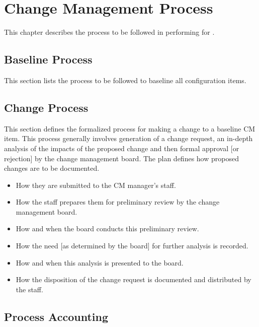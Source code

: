
\chapter{Change Management Process}
\label{loc:CM_Process}

This chapter describes the process to be followed in performing \CM for \ThisSystem.

\section{Baseline Process}
\label{loc:CM_ProcessBaseline}

This section lists the process to be followed to baseline all configuration items.

\section{Change Process}
\label{loc:CM_ProcessChange}

This section defines the formalized process for making a change to a baseline CM item. 
This process generally involves generation of a change request, an in-depth analysis of the impacts of the proposed change and then formal approval [or rejection] by the change management board. 
The plan defines how proposed changes are to be documented. 
\begin{itemize}[itemindent=5pt,topsep=0pt,itemsep=0pt,partopsep=0pt, parsep=0pt]
\item How they are submitted to the CM manager’s staff. 
\item How the staff prepares them for preliminary review by the change management board. 
\item How and when the board conducts this preliminary review. 
\item How the need [as determined by the board] for further analysis is recorded. 
\item How and when this analysis is presented to the board. 
\item How the disposition of the change request is documented and distributed by the staff.
\end{itemize}

\section{Process Accounting}
\label{loc:CM_ProcessAccounting}

